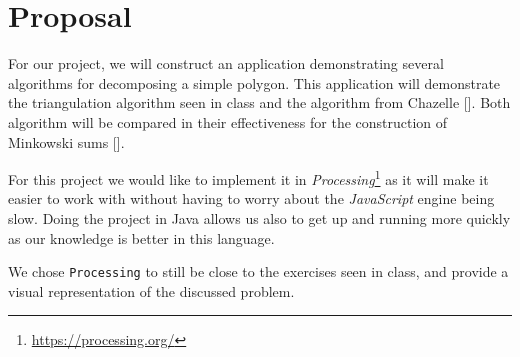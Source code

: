 \documentclass[11pt,a4paper]{article}
\begin{document}
\BgThispage



\clearpage
{}

\section{Proposal}

For our project, we will construct an application demonstrating several
algorithms for decomposing a simple polygon.
This application will demonstrate the triangulation algorithm seen in class and the
algorithm from Chazelle [\cite{chazelle_decomposing_1979}]. Both algorithm will
be compared in their effectiveness for the construction of Minkowski sums
    [\cite{agarwal_polygon_2002}].

For this project we would like to implement it in
\emph{Processing}\footnote{\url{https://processing.org/}} as it will make it
easier to work with without having to worry about the \emph{JavaScript} engine
being slow.
Doing the project in Java allows us also to get up and running more quickly as
our knowledge is better in this language.

We chose \verb|Processing| to still be close to the exercises seen in class, and
provide a visual representation of the discussed problem.

\printbibliography
\end{document}
